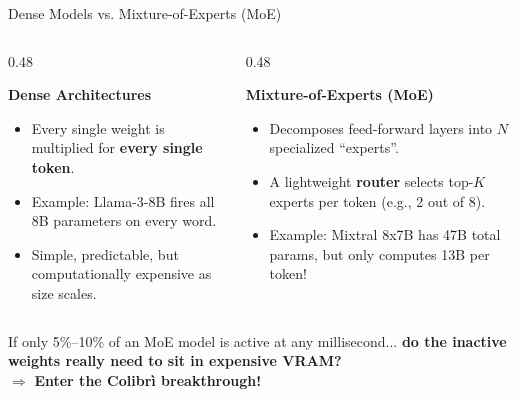 \documentclass[10pt,aspectratio=169]{beamer}
\begin{document}
\begin{frame}{Dense Models vs. Mixture-of-Experts (MoE)}
    \begin{columns}[T]
        \begin{column}{0.48\textwidth}
            \begin{block}{\textbf{Dense Architectures}}
                \begin{itemize}
                    \item Every single weight is multiplied for \textbf{every single token}.
                    \item Example: Llama-3-8B fires all 8B parameters on every word.
                    \item Simple, predictable, but computationally expensive as size scales.
                \end{itemize}
            \end{block}
        \end{column}
        \begin{column}{0.48\textwidth}
            \begin{exampleblock}{\textbf{Mixture-of-Experts (MoE)}}
                \begin{itemize}
                    \item Decomposes feed-forward layers into $N$ specialized ``experts''.
                    \item A lightweight \textbf{router} selects top-$K$ experts per token (e.g., 2 out of 8).
                    \item Example: Mixtral 8x7B has 47B total params, but only computes 13B per token!
                \end{itemize}
            \end{exampleblock}
        \end{column}
    \end{columns}
    \vspace{0.4cm}
    \begin{tcolorbox}[colback=ShoeTeal!10, colframe=ShoeTeal, title=\textbf{The Shoestring Epiphany}]
        \small
        If only 5\%--10\% of an MoE model is active at any millisecond... \textbf{do the inactive weights really need to sit in expensive VRAM?} \\
        $\Rightarrow$ \textbf{Enter the Colibr\`i breakthrough!}
    \end{tcolorbox}
\end{frame}
\end{document}
